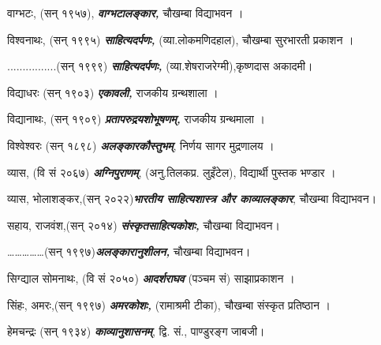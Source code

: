 \documentclass[10pt, a5paper, twoside]{article}
\begin{document}
\begin{flushleft}
वाग्भटः, (सन् १९५७), \textit{\textbf{वाग्भटालङ्कार,}} चौखम्बा विद्याभवन ।

विश्वनाथः, (सन् १९९५) \textit{\textbf{साहित्यदर्पणः,}} (व्या.लोकमणिदहाल), चौखम्बा सुरभारती प्रकाशन ।

................(सन् १९९९) \textit{\textbf{साहित्यदर्पणः,}} (व्या.शेषराजरेग्मी),कृष्णदास अकादमी।

विद्याधरः (सन् १९०३) \textit{\textbf{एकावली,}} राजकीय ग्रन्थशाला ।

विद्यानाथः, (सन् १९०९) \textit{\textbf{प्रतापरुद्रयशोभूषणम्,}} राजकीय ग्रन्थमाला ।

विश्वेश्वरः (सन् १८९८) \textit{\textbf{अलङ्कारकौस्तुभम्}}, निर्णय सागर मुद्रणालय ।

व्यास, (वि सं २०६७) \textit{\textbf{अग्निपुराणम्}}, (अनु.तिलकप्र. लुइँटेल), विद्यार्थी पुस्तक भण्डार  ।

व्यास, भोलाशङ्कर,(सन् २०२२)\textit{\textbf{भारतीय साहित्यशास्त्र और काव्यालङ्कार}}, चौखम्बा विद्याभवन।

सहाय, राजवंश,(सन् २०१४) \textit{\textbf{संस्कृतसाहित्यकोशः,}} चौखम्बा विद्याभवन।

……………(सन् १९९७)\textit{\textbf{अलङ्कारानुशीलन,}} चौखम्बा विद्याभवन।

सिग्द्याल सोमनाथः, (वि सं २०५०) \textit{\textbf{आदर्शराघव}} (पञ्चम सं) साझाप्रकाशन ।

सिंहः, अमरः,(सन् १९९७) \textit{\textbf{अमरकोशः,}} (रामाश्रमी टीका), चौखम्बा संस्कृत प्रतिष्ठान ।

हेमचन्द्रः (सन् १९३४) \textit{\textbf{काव्यानुशासनम्}}, द्वि. सं., पाण्डुरङ्ग जाबजी।

\end{flushleft}
\end{document}
